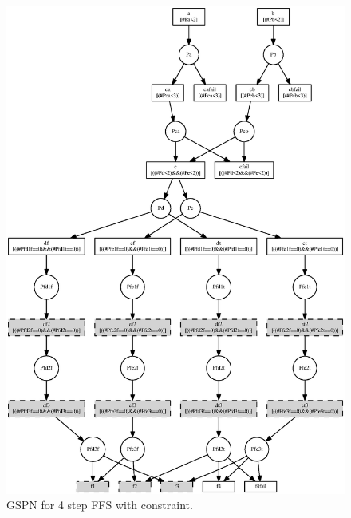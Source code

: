 \begin{figure}[p]
\begin{center}
	\includegraphics[height=\vsize]{fig/FFSo.eps}
\end{center}
\caption{GSPN for 4 step FFS with constraint.}
\label{fig:FFSo}
\end{figure}

